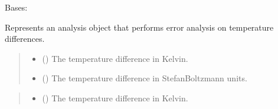 \documentclass[a4paper,11pt,english,openany]{sphinxmanual}
\begin{document}
\begin{fulllineitems}
\label{\detokenize{api/spyice.postprocess.analysis:src.spyice.postprocess.analysis.Analysis}}
\pysigstartsignatures
\pysigline
{}
\pysigstopsignatures
\sphinxAtStartPar
Bases: 

\sphinxAtStartPar
Represents an analysis object that performs error analysis on temperature differences.
\begin{quote}\begin{description}
\begin{itemize}
\item {} 
\sphinxAtStartPar
{} () \textendash{} The temperature difference in Kelvin.

\item {} 
\sphinxAtStartPar
{} () \textendash{} The temperature difference in Stefan\sphinxhyphen{}Boltzmann units.

\end{itemize}

\end{description}\end{quote}

\begin{fulllineitems}
\label{\detokenize{api/spyice.postprocess.analysis:src.spyice.postprocess.analysis.Analysis.__init__}}
\pysigstartsignatures
\pysiglinewithargsret
{}
{\sphinxparamcomma {}}
{}
\pysigstopsignatures\begin{quote}\begin{description}
\begin{itemize}
\item {} 
\sphinxAtStartPar
{} () \textendash{} The temperature difference in Kelvin.


\end{itemize}
\end{description}
\end{quote}
\end{fulllineitems}
\end{fulllineitems}
\end{document}
